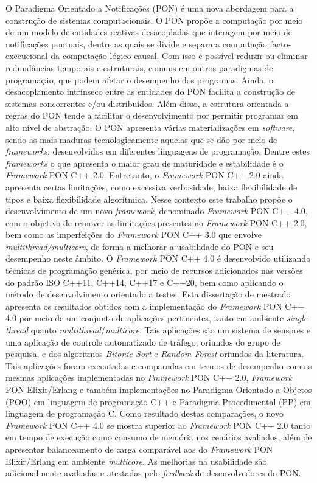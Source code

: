 \begin{resumo}

O Paradigma Orientado a Notificações (PON) é uma nova abordagem para a
construção de sistemas computacionais. O PON propõe a computação por meio de um
modelo de entidades reativas desacopladas que interagem por meio de notificações
pontuais, dentre as quais se divide e separa a computação facto-execucional da
computação lógico-causal. Com isso é possível reduzir ou eliminar redundâncias
temporais e estruturais, comuns em outros paradigmas de programação, que podem
afetar o desempenho dos programas. Ainda, o desacoplamento intrínseco entre as
entidades do PON facilita a construção de sistemas concorrentes e/ou
distribuídos. Além disso, a estrutura orientada a regras do PON tende a
facilitar o desenvolvimento por permitir programar em alto nível de abstração. O
PON apresenta várias materializações em \textit{software}, sendo as mais maduras
tecnologicamente aquelas que se dão por meio de \textit{frameworks},
desenvolvidos em diferentes linguagens de programação. Dentre estes
\textit{frameworks} o que apresenta o maior grau de maturidade e estabilidade é
o \textit{Framework} PON C++ 2.0. Entretanto, o \textit{Framework} PON C++ 2.0
ainda apresenta certas limitações, como excessiva verbosidade, baixa
flexibilidade de tipos e baixa flexibilidade algorítmica. Nesse contexto este
trabalho propõe o desenvolvimento de um novo \textit{framework}, denominado
\textit{Framework} PON C++ 4.0, com o objetivo de remover as limitações
presentes no \textit{Framework} PON C++ 2.0, bem como as imperfeições do
\textit{Framework} PON C++ 3.0  que envolve \textit{multithread/multicore}, de
forma a melhorar a usabilidade do PON e seu desempenho neste âmbito. O
\textit{Framework} PON C++ 4.0 é desenvolvido utilizando técnicas de programação
genérica, por meio de recursos adicionados nas versões do padrão ISO C++11,
C++14, C++17 e C++20, bem como aplicando o método de desenvolvimento orientado a
testes. Esta dissertação de mestrado apresenta os resultados obtidos com a
implementação do \textit{Framework} PON C++ 4.0 por meio de um conjunto de
aplicações pertinentes, tanto em ambiente \textit{single thread} quanto
\textit{multithread}/\textit{multicore}. Tais aplicações são um sistema de
sensores e uma aplicação de controle automatizado de tráfego, oriundos do grupo
de pesquisa, e dos algoritmos \textit{Bitonic Sort} e \textit{Random Forest}
oriundos da literatura. Tais aplicações foram executadas e comparadas em termos
de desempenho com as mesmas aplicações implementadas no \textit{Framework} PON
C++ 2.0, \textit{Framework} PON Elixir/Erlang e também implementações no
Paradigma Orientado a Objetos (POO) em linguagem de programação C++ e Paradigma
Procedimental (PP) em linguagem de programação C. Como resultado destas
comparações, o novo \textit{Framework} PON C++ 4.0 se mostra superior ao
\textit{Framework} PON C++ 2.0 tanto em tempo de execução como consumo de
memória nos cenários avaliados, além de apresentar balanceamento de carga
comparável aos do \textit{Framework} PON Elixir/Erlang em ambiente
\textit{multicore}. As melhorias na usabilidade são adicionalmente avaliadas e
atestadas pelo \textit{feedback} de desenvolvedores do PON. 


\end{resumo}
